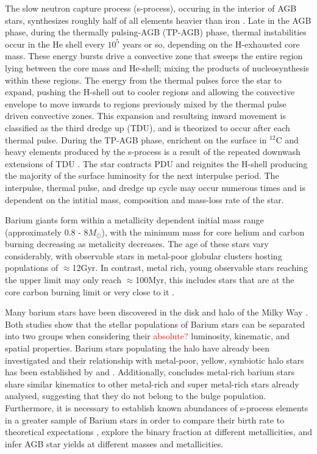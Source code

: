 \documentclass[a4paper,fleqn,usenatbib]{mnras}
\newcommand{\todo}[1]{\textcolor{red}{#1}}
\begin{document}
The slow neutron capture process (s-process), occuring in the interior of AGB stars, synthesizes roughly half of all elements heavier than iron \citep[e.g.][]{busso1999,travaglio2001,herwig2005,romano2010,kobayashi2011,prantzos2012,bisterzo2014,karakas12016}. Late in the AGB phase, during the thermally pulsing-AGB (TP-AGB) phase, thermal instabilities occur in the He shell every $10^5$ years or so, depending on the H-exhausted core mass. These energy bursts drive a convective zone that sweeps the entire region lying between the core mass and He-shell; mixing the products of nucleosynthesis within these regions. The energy from the thermal pulses force the star to expand, pushing the H-shell out to cooler regions and allowing the convective envelope to move inwards to regions previously mixed by the thermal pulse driven convective zones. This expansion and resultsing inward movement is classified as the third dredge up (TDU), and is theorized to occur after each thermal pulse. During the TP-AGB phase, enrichent on the surface in $^{12}$C and heavy elements produced by the s-process is a result of the repeated downwash extensions of TDU \citep[e.g.][]{busso2001}. The star contracts PDU and reignites the H-shell producing the majority of the surface luminosity for the next interpulse period. The interpulse, thermal pulse, and dredge up cycle may occur numerous times and is dependent on the intitial mass, composition and mass-loss rate of the star.

Barium giants form within a metallicity dependent initial mass range (approximately 0.8 - 8$M_{\odot}$), with the minimum mass for core helium and carbon burning decreasing as metalicity decreases. The age of these stars vary considerably, with observable stars in metal-poor globular clusters hosting populations of $\approx$12Gyr. In contrast, metal rich, young observable stars reaching the upper limit may only reach $\approx$100Myr, this includes stars that are at the core carbon burning limit or very close to it \citep[e.g.][]{whitelock2013}.

Many barium stars have been discovered in the disk and halo of the Milky Way \citep{gomez1997,mennessier1997}. Both studies show that the stellar populations of Barium stars can be separated into two groups when considering their \todo{absolute?} luminosity, kinematic, and spatial properties. Barium stars populating the halo have already been investigated \citep[e.g.][]{junqueira2001,drake2008,pereira2009,allen2006} and their relationship with metal-poor, yellow, symbiotic halo stars has been established by \citet{jorissen2005} and \citet{pereira2009}. Additionally, \citet{pereira2011} concludes metal-rich barium stars share similar kinematics to other metal-rich and super metal-rich stars already analysed, suggesting that they do not belong to the bulge population. Furthermore, it is necessary to establish known abundances of s-process elements in a greater sample of Barium stars in order to compare their birth rate to theoretical expectations \citep{han1995}, explore the binary fraction at different metallicities, and infer AGB star yields at different masses and metallicities.
\end{document}
